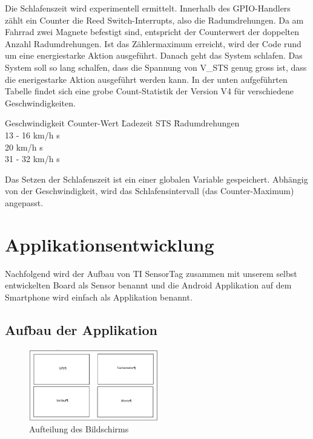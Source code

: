 Die Schlafenszeit wird experimentell ermittelt. Innerhalb des GPIO-Handlers zählt ein Counter die Reed Switch-Interrupts, also die Radumdrehungen. Da am Fahrrad zwei Magnete befestigt sind, entspricht der Counterwert der doppelten Anzahl Radumdrehungen. Ist  das Zählermaximum erreicht, wird der Code rund um eine energiestarke Aktion ausgeführt. Danach geht das System schlafen. Das System soll so lang schalfen, dass die Spannung von V\_STS genug gross ist, dass die enerigestarke Aktion ausgeführt werden kann. In der unten aufgeführten Tabelle findet sich eine grobe Count-Statistik der Version V4 für verschiedene Geschwindigkeiten. 

\begin{minipage}{\textwidth}
    \begin{tabbing}
   Geschwindigkeit \quad\= Counter-Wert  \quad\= Ladezeit STS    \quad\= Radumdrehungen\\[0.8ex]
   13 - 16 km/h                          s    \\
   20 km/h                                s    \\
   31 - 32 km/h                           s    \\    
    \end{tabbing}
\end{minipage}

Das Setzen der Schlafenszeit ist ein einer globalen Variable gespeichert. Abhängig von der Geschwindigkeit, wird das Schlafensintervall (das Counter-Maximum) angepasst.






\section{Applikationsentwicklung}
Nachfolgend wird der Aufbau von TI SensorTag zusammen mit unserem selbst entwickelten Board als Sensor benannt und die Android Applikation auf dem Smartphone wird einfach als Applikation benannt.

\subsection{Aufbau der Applikation}

\begin{figure}[ht]
    \includegraphics[width=0.5\textwidth]{3Vorgehen/imag/Aufbau_Applikation_erste_Version.png}
    \caption{Aufteilung des Bildschirms}\label{aufbau_applikation_1} 
\end{figure}

